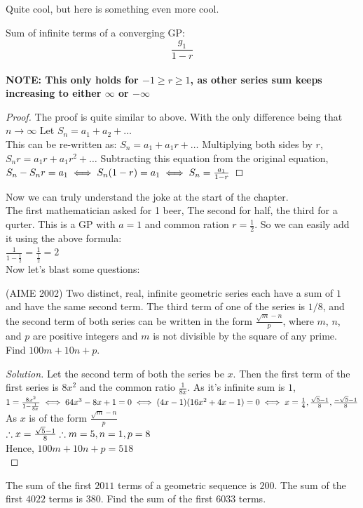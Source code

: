 Quite cool, but here is something even more cool.
\begin{theorem}
    Sum of infinite terms of a converging GP:\\
    \[\frac{g_1}{1-r}\]\\
    \textbf{NOTE: This only holds for $-1\geq r \geq 1$, as other series sum keeps increasing to either $\infty$ or $-\infty$}
\end{theorem}
\begin{proof}
The proof is quite similar to above. With the only difference being that $n \rightarrow \infty$
Let $S_n = a_1 + a_2 + \dots$\\
This can be re-written as:
$S_n = a_1 + a_1r + \dots$
Multiplying both sides by $r$,
$S_nr = a_1r + a_1r^2 + \dots $
Subtracting this equation from the original equation,\\
$S_n-S_nr = a_1\\
\iff S_n(1-r)=a_1\\
\iff S_n=\frac{a_1}{1-r}$
\end{proof}
Now we can truly understand the joke at the start of the chapter.\\
The first mathematician asked for 1 beer, The second for half, the third for a qurter. This is a GP with $a=1$ and common ration $r=\frac{1}{2}$. So we can easily add it using the above formula:\\
$\frac{1}{1-\frac{1}{2}}=\frac{1}{\frac{1}{2}}=2$\\
Now let's blast some questions:\\
\begin{example}
    (AIME 2002) Two distinct, real, infinite geometric series each have a sum of $1$ and have the same second term. The third term of one of the series is $1/8$, and the second term of both series can be written in the form $\frac{\sqrt{m}-n}p$, where $m$, $n$, and $p$ are positive integers and $m$ is not divisible by the square of any prime. Find $100m+10n+p$.
\end{example}
\begin{proof}
    [Solution]
    Let the second term of both the series be $x$. Then the first term of the first series is $8x^2$ and the common ratio $\frac{1}{8x}$. As it's infinite sum is $1$,\\
    $1=\frac{8x^2}{1-\frac{1}{8x}}\\
    \iff 64x^3-8x+1=0\\
    \iff (4x-1)(16x^2+4x-1)=0
    \iff x=\frac{1}{4}, \frac{\sqrt{5}-1}{8}, \frac{-\sqrt{5}-1}{8}$\\
    As $x$ is of the form $\frac{\sqrt{m}-n}p$\\
    $\therefore x=\frac{\sqrt{5}-1}{8}\\
    \therefore m=5, n=1, p=8$\\
    Hence, $100m+10n+p=518$\\
\end{proof}
\begin{example}
    The sum of the first $2011$ terms of a geometric sequence is $200$. The sum of the first $4022$ terms is $380$. Find
the sum of the first $6033$ terms.
\end{example}
